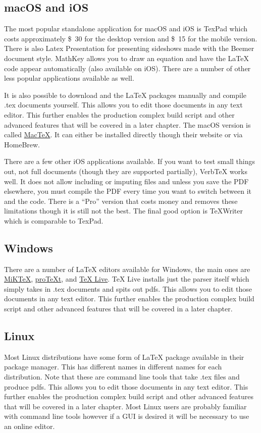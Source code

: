 \subsection{macOS and iOS}
The most popular standalone application for macOS and iOS is TexPad which costs approximately \SI{30}[\$]{} for the desktop version and \SI{15}[\$]{} for the mobile version. There is also Latex Presentation for presenting sideshows made with the Beemer document style. MathKey allows you to draw an equation and have the \LaTeX{} code appear automatically (also available on iOS). There are a number of other less popular applications available as well.\par
It is also possible to download and the \LaTeX{} packages manually and compile .tex documents yourself. This allows you to edit those documents in any text editor. This further enables the production complex build script and other advanced features that will be covered in a later chapter. The macOS version is called \href{http://www.tug.org/mactex/}{MacTeX}. It can either be installed directly though their website or via HomeBrew.\par
There are a few other iOS applications available. If you want to test small things out, not full documents (though they are supported partially), VerbTeX works well. It does not allow including or imputing files and unless you save the PDF elsewhere, you must compile the PDF every time you want to switch between it and the code. There is a ``Pro'' version that costs money and removes these limitations though it is still not the best. The final good option is TeXWriter which is comparable to TexPad.

\subsection{Windows}
There are a number of \LaTeX{} editors available for Windows, the main ones are \href{https://miktex.org/}{MiKTeX}, \href{http://www.tug.org/protext/}{proTeXt}, and \href{http://www.tug.org/texlive/}{TeX Live}. TeX Live installs just the parser itself which simply takes in .tex documents and spits out pdfs. This allows you to edit those documents in any text editor. This further enables the production complex build script and other advanced features that will be covered in a later chapter.

\subsection{Linux}
Most Linux distributions have some form of \LaTeX{} package available in their package manager. This has different names in different names for each distribution. Note that these are command line tools that take .tex files and produce pdfs. This allows you to edit those documents in any text editor. This further enables the production complex build script and other advanced features that will be covered in a later chapter. Most Linux users are probably familiar with command line tools however if a GUI is desired it will be necessary to use an online editor.